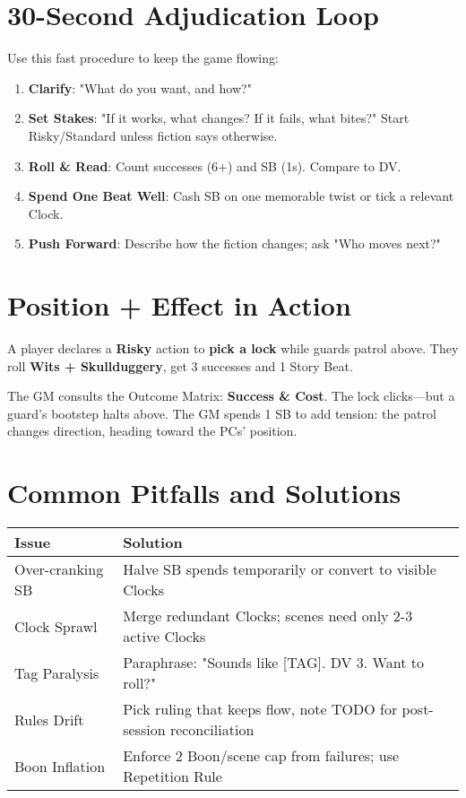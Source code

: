 \section{30-Second Adjudication Loop}

Use this fast procedure to keep the game flowing:

\begin{enumerate}
    \item \textbf{Clarify}: "What do you want, and how?"
    \item \textbf{Set Stakes}: "If it works, what changes? If it fails, what bites?" Start Risky/Standard unless fiction says otherwise.
    \item \textbf{Roll \& Read}: Count successes (6+) and SB (1s). Compare to DV.
    \item \textbf{Spend One Beat Well}: Cash SB on one memorable twist or tick a relevant Clock.
    \item \textbf{Push Forward}: Describe how the fiction changes; ask "Who moves next?"
\end{enumerate}

\section{Position + Effect in Action}

A player declares a \textbf{Risky} action to \textbf{pick a lock} while guards patrol above. They roll \textbf{Wits + Skullduggery}, get 3 successes and 1 Story Beat.

The GM consults the Outcome Matrix: \textbf{Success \& Cost}. The lock clicks---but a guard's bootstep halts above. The GM spends 1 SB to add tension: the patrol changes direction, heading toward the PCs' position.

\section{Common Pitfalls and Solutions}

\begin{fatebox}
\begin{tabularx}{\textwidth}{lX}
\toprule
\textbf{Issue} & \textbf{Solution} \\
\midrule
Over-cranking SB & Halve SB spends temporarily or convert to visible Clocks \\
Clock Sprawl & Merge redundant Clocks; scenes need only 2-3 active Clocks \\
Tag Paralysis & Paraphrase: "Sounds like [TAG]. DV 3. Want to roll?" \\
Rules Drift & Pick ruling that keeps flow, note TODO for post-session reconciliation \\
Boon Inflation & Enforce 2 Boon/scene cap from failures; use Repetition Rule \\
\bottomrule
\end{tabularx}
\end{fatebox}
